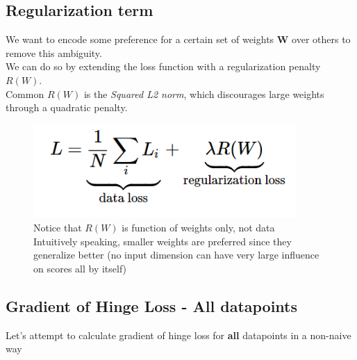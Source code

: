 \documentclass{article}
\begin{document}
\subsection{Regularization term}
We want to encode some preference for a certain set of weights $\boldsymbol{W}$ over others to remove this ambiguity.\\
We can do so by extending the loss function with a regularization penalty $R(W)$.\\
Common $R(W)$ is the \textit{Squared L2 norm}, which discourages large weights through a quadratic penalty.

\begin{figure}[htp]
    \centering
    \includegraphics[width=10cm, scale=1]{images/regularizationFormula.PNG}
    \captionsetup{justification=centering}
    \caption{Notice that $R(W)$ is function of weights only, not data\\
                Intuitively speaking, smaller weights are preferred since they generalize better (no input dimension can have very large influence on scores all by itself)}
\end{figure}

\subsection{Gradient of Hinge Loss - All datapoints}
Let's attempt to calculate gradient of hinge loss for \textbf{all} datapoints in a non-naive way
\setcounter{equation}{0}
\end{document}
